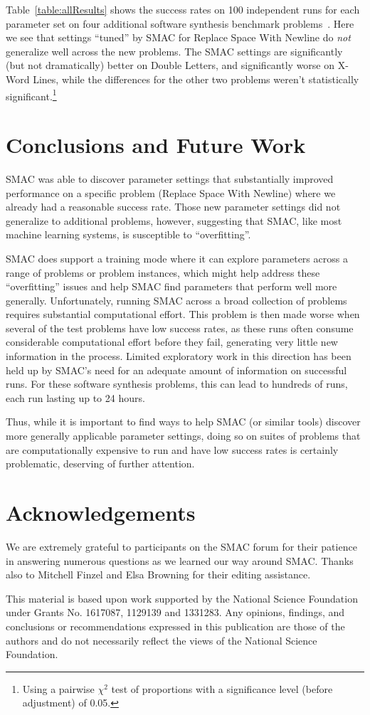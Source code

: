Table~\ref{table:allResults} shows the success rates on 100 independent runs
for each parameter set on four additional software synthesis benchmark
problems~\cite{Helmuth:2015:GECCO}. Here we see that settings
``tuned'' by SMAC for Replace Space With Newline do \emph{not} generalize
well across the new problems. The SMAC settings are significantly
(but not dramatically) better on
Double Letters, and significantly worse on X-Word Lines, while the differences for
the other two problems weren't statistically significant.\footnote{Using a
	pairwise $\chi^2$ test of proportions with a significance level (before
	adjustment) of 0.05.}

\section{Conclusions and Future Work}
\label{sec:conclusions}

SMAC was able to discover parameter settings that substantially improved
performance on a specific problem (Replace Space With Newline) where we already
had a reasonable success rate. Those new parameter settings did not generalize
to additional problems, however, suggesting that SMAC, like most machine
learning systems, is susceptible to ``overfitting''.

SMAC does support a training mode where it can explore parameters across a range
of problems or problem instances, which might help address these ``overfitting''
issues and help SMAC find parameters that perform well more generally.
Unfortunately, running SMAC across a broad
collection of problems requires substantial computational effort. This 
problem is then made worse when several of the test problems have low success rates, as these runs often 
consume considerable computational effort before they fail, 
generating very little new information in the process.
Limited exploratory work in this direction has been held up by SMAC's need for 
an adequate amount of information on successful runs.  For these software 
synthesis problems, this can lead to hundreds of runs, each run lasting up to 
24 hours.

Thus, while it is important to find ways to help SMAC (or similar tools)
discover more generally applicable parameter settings, doing so on suites 
of problems that are computationally expensive to run and have low success rates is certainly problematic, deserving of further attention.

\section*{Acknowledgements}
\label{sec:acknowledgements}

We are extremely grateful to participants on the SMAC forum for their patience
in answering numerous questions as we learned our way around
SMAC. Thanks also to Mitchell Finzel and Elsa Browning for their editing assistance.

This material is based upon work supported by the National Science Foundation under Grants No. 1617087, 1129139 and 1331283. Any opinions, findings, and conclusions or recommendations expressed in this publication are those of the authors and do not necessarily reflect the views of the National Science Foundation.